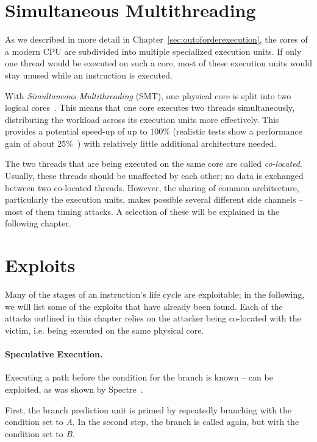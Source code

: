 \documentclass[11pt,
  titlepage=false,
]{scrreprt}
\begin{document}
\section{Simultaneous Multithreading}
\label{sec:smt}

As we described in more detail in Chapter~\ref{sec:outoforderexecution},
the cores of a modern CPU are subdivided into multiple specialized execution units.
If only one thread would be executed on such a core,
most of these execution units would stay unused while an instruction is executed.

With \textit{Simultaneous Multithreading} (SMT), one physical core is split into two logical cores~\cite{tullsen1995simultaneous}.
This means that one core executes two threads simultaneously, distributing the workload across its execution units more effectively.
This provides a potential speed-up of up to $100\%$
(realistic tests show a performance gain of about $25\%$~\cite{Phoronix2018HT, Cutress2020SMT})
with relatively little additional architecture needed.

The two threads that are being executed on the same core are called \textit{co-located}.
Usually, these threads should be unaffected by each other; no data is exchanged between two co-located threads.
However, the sharing of common architecture, particularly the execution units,
makes possible several different side channels -- most of them timing attacks.
A selection of these will be explained in the following chapter.

\section{Exploits}
\label{sec:exploits}
Many of the stages of an instruction's life cycle are exploitable;
in the following, we will list some of the exploits that have already been found.
Each of the attacks outlined in this chapter relies on the attacker being co-located with the victim,
i.e. being executed on the same physical core.

\paragraph{Speculative Execution.}
Executing a path before the condition for the branch is known --
can be exploited, as was shown by Spectre~\cite{spKocherHFGGHHLM019}.

First, the branch prediction unit is primed by repeatedly branching with the condition set to \textit{A}.
In the second step, the branch is called again, but with the condition set to \textit{B}.
\end{document}
